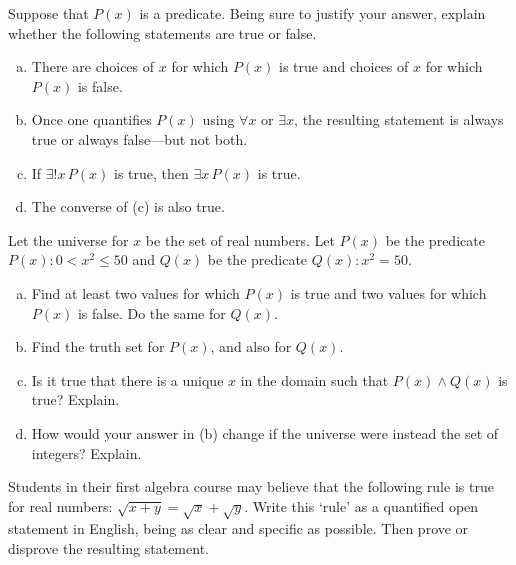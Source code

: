 \documentclass[11pt,letterpaper]{article}
\begin{document}

 Suppose that $P(x)$ is a predicate. Being sure to justify your answer, explain whether the following statements are true or false.
	\begin{enumerate}[(a)]
	\item There are choices of $x$ for which $P(x)$ is true and choices of $x$ for which $P(x)$ is false.
	\item Once one quantifies $P(x)$ using $\forall x$ or $\exists x$, the resulting statement is always true or always false---but not both.
	\item If $\exists!x\, P(x)$ is true, then $\exists x\, P(x)$ is true. 
	\item The converse of (c) is also true.
	\end{enumerate}



\newpage



 Let the universe for $x$ be the set of real numbers. Let $P(x)$ be the predicate $P(x) \colon 0 < x^2 \leq 50$ and $Q(x)$ be the predicate $Q(x) \colon x^2= 50$.
	\begin{enumerate}[(a)]
	\item Find at least two values for which $P(x)$ is true and two values for which $P(x)$ is false. Do the same for $Q(x)$. 
	\item Find the truth set for $P(x)$, and also for $Q(x)$.
	\item Is it true that there is a unique $x$ in the domain such that $P(x) \wedge Q(x)$ is true? Explain.
	\item How would your answer in (b) change if the universe were instead the set of integers? Explain. 
	\end{enumerate}



\newpage



 Students in their first algebra course may believe that the following rule is true for real numbers: $\sqrt{x + y}= \sqrt{x} + \sqrt{y}$. Write this `rule' as a quantified open statement in English, being as clear and specific as possible. Then prove or disprove the resulting statement.  
\end{document}
